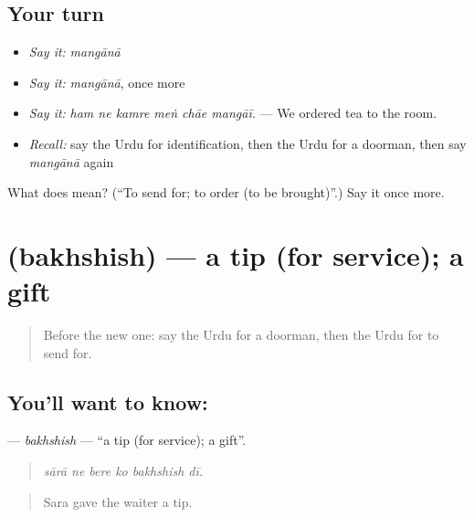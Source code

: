 \subsection*{Your turn}
\begin{itemize}
\raggedright
  \item \emph{Say it:} \emph{mangānā}
  \item \emph{Say it:} \emph{mangānā}, once more
  \item \emph{Say it:} \emph{ham ne kamre meṅ chāe mangāī.} — We ordered tea to the room.
  \item \emph{Recall:} say the Urdu for identification, then the Urdu for a doorman, then say \emph{mangānā} again
\end{itemize}

\begin{tcolorbox}[breakable,colback=teal!4,colframe=teal!35!black,title={Before you move on}]
What does  mean? (\textquotedblleft{}To send for; to order (to be brought)\textquotedblright{}.) Say it once more.
\end{tcolorbox}
\section[\texorpdfstring{\ur{بخشش} (bakhshish)}{بخشش (bakhshish)}]{ (bakhshish) — a tip (for service); a gift}

\label{lesson:UR-C405-bakhshish}



\begin{quote}
Before the new one: say the Urdu for a doorman, then the Urdu for to send for.
\end{quote}

\subsection*{You'll want to know: }
\textbf{} — \emph{bakhshish} — \textquotedblleft{}a tip (for service); a gift\textquotedblright{}.

\begin{quote}
     
\end{quote}

\begin{quote}
\emph{sārā ne bere ko bakhshish dī.}
\end{quote}

\begin{quote}
Sara gave the waiter a tip.
\end{quote}

